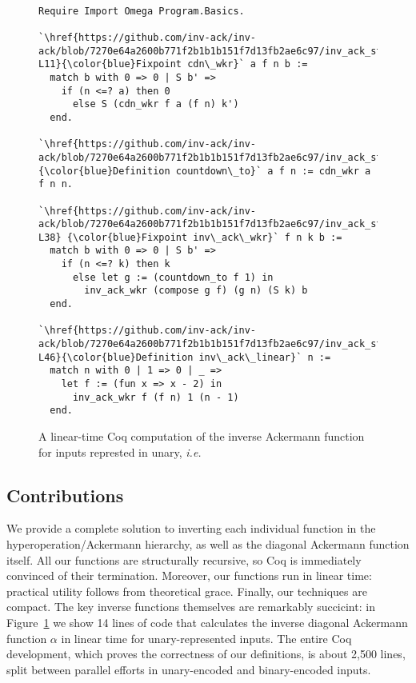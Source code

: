 \begin{figure}
\lstset{style=myTinyStyle}
\begin{lstlisting}

Require Import Omega Program.Basics.

`\href{https://github.com/inv-ack/inv-ack/blob/7270e64a2600b771f2b1b1b151f7d13fb2ae6c97/inv_ack_standalone.v#L6-L11}{\color{blue}Fixpoint cdn\_wkr}` a f n b :=
  match b with 0 => 0 | S b' =>
    if (n <=? a) then 0
      else S (cdn_wkr f a (f n) k')
  end.

`\href{https://github.com/inv-ack/inv-ack/blob/7270e64a2600b771f2b1b1b151f7d13fb2ae6c97/inv_ack_standalone.v#L14}{\color{blue}Definition countdown\_to}` a f n := cdn_wkr a f n n.

`\href{https://github.com/inv-ack/inv-ack/blob/7270e64a2600b771f2b1b1b151f7d13fb2ae6c97/inv_ack_standalone.v#L32-L38} {\color{blue}Fixpoint inv\_ack\_wkr}` f n k b :=
  match b with 0 => 0 | S b' =>
    if (n <=? k) then k
      else let g := (countdown_to f 1) in
        inv_ack_wkr (compose g f) (g n) (S k) b
  end.

`\href{https://github.com/inv-ack/inv-ack/blob/7270e64a2600b771f2b1b1b151f7d13fb2ae6c97/inv_ack_standalone.v#L42-L46}{\color{blue}Definition inv\_ack\_linear}` n :=
  match n with 0 | 1 => 0 | _ => 
    let f := (fun x => x - 2) in
      inv_ack_wkr f (f n) 1 (n - 1)
  end.
\end{lstlisting}
\caption{A linear-time Coq computation of the inverse Ackermann function for inputs represted in unary, \emph{i.e.} }
\label{fig:standalone}
\end{figure}

\subsection{Contributions}
We provide a complete solution to inverting each individual function in the hyperoperation/Ackermann hierarchy,
as well as the diagonal Ackermann function itself.  All our functions are structurally recursive, so
Coq is immediately convinced of their termination.  Moreover, our functions run in linear time: practical utility follows from theoretical grace.
Finally, our techniques are compact.  The key inverse functions themselves are remarkably succicint: in Figure~\ref{fig:standalone} we show 14 lines of code that calculates the inverse diagonal Ackermann function $\alpha$ in linear time for unary-represented inputs. The entire Coq development, which proves the correctness of our definitions, is about 2,500 lines, split between parallel efforts in unary-encoded and binary-encoded inputs.


